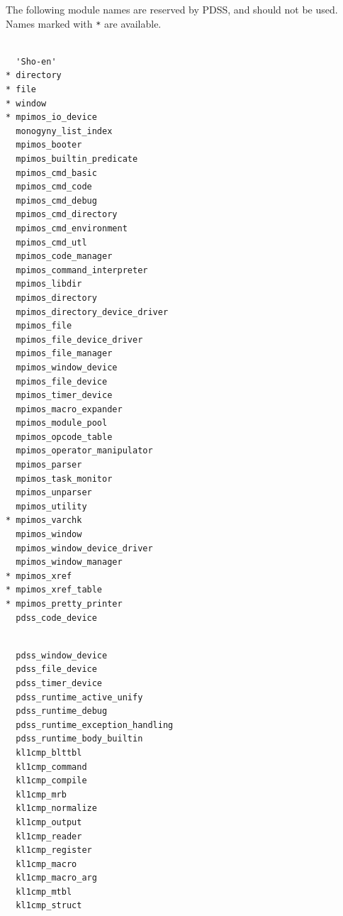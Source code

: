 The following module names are reserved by PDSS, and should not be used.
Names marked with \verb|*| are available.
\begin{center}
\begin{minipage}[t]{70mm}
\begin{verbatim}

  'Sho-en'
* directory
* file
* window
* mpimos_io_device
  monogyny_list_index
  mpimos_booter
  mpimos_builtin_predicate
  mpimos_cmd_basic
  mpimos_cmd_code
  mpimos_cmd_debug
  mpimos_cmd_directory
  mpimos_cmd_environment
  mpimos_cmd_utl
  mpimos_code_manager
  mpimos_command_interpreter
  mpimos_libdir
  mpimos_directory
  mpimos_directory_device_driver
  mpimos_file
  mpimos_file_device_driver
  mpimos_file_manager
  mpimos_window_device
  mpimos_file_device
  mpimos_timer_device
  mpimos_macro_expander
  mpimos_module_pool
  mpimos_opcode_table
  mpimos_operator_manipulator
  mpimos_parser
  mpimos_task_monitor
  mpimos_unparser
  mpimos_utility
* mpimos_varchk
  mpimos_window
  mpimos_window_device_driver
  mpimos_window_manager
* mpimos_xref
* mpimos_xref_table
* mpimos_pretty_printer
  pdss_code_device

\end{verbatim}
\end{minipage}
\begin{minipage}[t]{70mm}
\begin{verbatim}

  pdss_window_device
  pdss_file_device
  pdss_timer_device
  pdss_runtime_active_unify
  pdss_runtime_debug
  pdss_runtime_exception_handling
  pdss_runtime_body_builtin
  kl1cmp_blttbl
  kl1cmp_command
  kl1cmp_compile
  kl1cmp_mrb
  kl1cmp_normalize
  kl1cmp_output
  kl1cmp_reader
  kl1cmp_register
  kl1cmp_macro
  kl1cmp_macro_arg
  kl1cmp_mtbl
  kl1cmp_struct

\end{verbatim}
\end{minipage}
\end{center}

\newpage
{}

